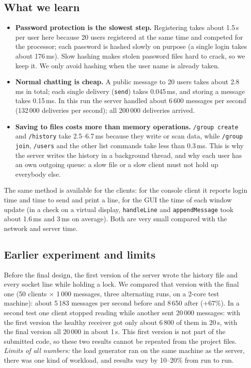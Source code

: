\documentclass[conference]{IEEEtran}
\newcommand{\code}[1]{\texttt{#1}}
\begin{document}
\subsection{What we learn}
\begin{itemize}
\item \textbf{Password protection is the slowest step.} Registering takes about 1.5\,s per user here because 20 users registered at the same time and competed for the processor; each password is hashed slowly on purpose (a single login takes about 176\,ms).
Slow hashing makes stolen password files hard to crack, so we keep it. We only avoid hashing when the user name is already taken.
\item \textbf{Normal chatting is cheap.} A public message to 20 users takes about 2.8\,ms in total; each single delivery (\code{send}) takes 0.045\,ms, and storing a message takes 0.15\,ms. In this run the server handled about 6\,600 messages per second (132\,000 deliveries per second); all 200\,000 deliveries arrived.
\item \textbf{Saving to files costs more than memory operations.} \code{/group create} and \code{/history} take 2.5--6.7\,ms because they write or scan data, while \code{/group join}, \code{/users} and the other list commands take less than 0.3\,ms.
This is why the server writes the history in a background thread, and why each user has an own outgoing queue: a slow file or a slow client must not hold up everybody else.
\end{itemize}
The same method is available for the clients: for the console client it reports login time and time to send and print a line, for the GUI the time of each window update (in a check on a virtual display, \code{handleLine} and \code{appendMessage} took about 1.6\,ms and 3\,ms on average). Both are very small compared with the network and server time.

\subsection{Earlier experiment and limits}
Before the final design, the first version of the server wrote the history file and every socket line while holding a lock. We compared that version with the final one
(50 clients $\times$ 1\,000 messages, three alternating runs, on a 2-core test machine): about 5\,183 messages per second before and 8\,650 after ($+67\%$).
In a second test one client stopped reading while another sent 20\,000 messages: with the first version the healthy receiver got only about 6\,800 of them in 20\,s, with the final version all 20\,000 in about 1\,s.
This first version is not part of the submitted code, so these two results cannot be repeated from the project files.
\emph{Limits of all numbers:} the load generator ran on the same machine as the server, there was one kind of workload, and results vary by 10--20\% from run to run.
\end{document}
